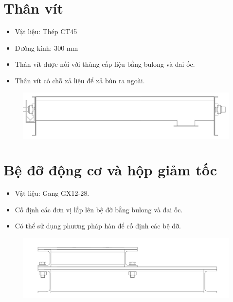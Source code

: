 \section{Thân vít}
\begin{itemize}
    \item Vật liệu: Thép CT45
    \item Đường kính: 300 mm
    \item Thân vít được nối với thùng cấp liệu bằng bulong và đai ốc.
    \item Thân vít có chỗ xả liệu để xả bùn ra ngoài.
\end{itemize}
\begin{figure}[H]
    \centering
    \includegraphics[width=1\textwidth]{pictures/than.png}
\end{figure}

\section{Bệ đỡ động cơ và hộp giảm tốc}
\begin{itemize}
    \item Vật liệu: Gang GX12-28.
    \item Cố định các đơn vị lắp lên bệ đỡ bằng bulong và đai ốc.
    \item Có thể sử dụng phương pháp hàn để cố định các bệ đỡ.
\end{itemize}
\begin{figure}[H]
    \centering
    \includegraphics[width=1\textwidth]{pictures/be.png}
\end{figure}

